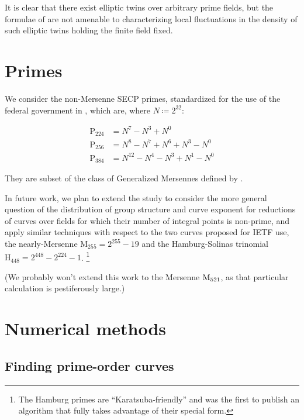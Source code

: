 \documentclass[11pt,fleqn]{article}
\newcommand{\mathup}{\mathrm}
\newcommand{\Pa}{\ensuremath{\mathup{P}_{224}} }
\newcommand{\Pb}{\ensuremath{\mathup{P}_{256}} }
\newcommand{\Pc}{\ensuremath{\mathup{P}_{384}} }
\newcommand{\Pd}{\ensuremath{\mathup{M}_{255}} }
\newcommand{\Pg}{\ensuremath{\mathup{H}_{448}} }
\begin{document}
It is clear that there exist elliptic twins over arbitrary prime fields, but
the formulae of \autocite{ShparlinskiSutantyo} are not amenable to characterizing
local fluctuations in the density of such elliptic twins holding the finite
field fixed.

\section{Primes}

We consider the non-Mersenne SECP primes, standardized for the use of the
federal government in \cite{recur}, which are, where $N \coloneqq 2^{32}$:

\begin{equation}
\begin{aligned}
    \Pa &= N^7 - N^3 + N^0                \\
    \Pb &= N^8 - N^7 + N^6 + N^3 - N^0    \\
    \Pc &= N^{12} - N^4 - N^3 + N^1 - N^0
\end{aligned}
\end{equation}

They are subset of the class of Generalized Mersennes defined by
\autocite{Solinas}.


In future work, we plan to extend the study to consider the more general question
of the distribution of group structure and curve exponent for reductions of
curves over fields for which their number of integral points is non-prime, and apply
similar techniques with respect to the two curves proposed for IETF use, the
nearly-Mersenne $\Pd = 2^{255}-19$ and the Hamburg-Solinas trinomial $\Pg = 2^{448}-2^{224}-1$.
\footnote{The Hamburg primes are ``Karatsuba-friendly'' and \autocite{Hamburg}
was the first to publish an algorithm that fully takes advantage of their special
form.}

(We probably won't extend this work to the Mersenne $\textup{M}_{521}$, as that
particular calculation is pestiferously large.)

\section{Numerical methods}

\subsection{Finding prime-order curves}
\end{document}
